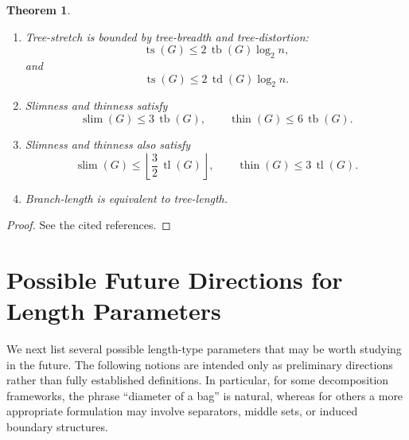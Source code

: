 \documentclass[10pt]{book}
\newtheorem{theorem}{Theorem}[section]
\theoremstyle{definition}
\DeclareMathOperator{\tl}{tl}
\DeclareMathOperator{\tb}{tb}
\begin{document}
\begin{theorem}
\begin{enumerate}
    \item Tree-stretch is bounded by tree-breadth and tree-distortion:
    \[
    \operatorname{ts}(G)\le 2\,\tb(G)\log_2 n,
    \]
    and
    \[
    \operatorname{ts}(G)\le 2\,\operatorname{td}(G)\log_2 n.
    \]
    \cite{dragan2014approximation}

    \item Slimness and thinness satisfy
    \[
    \operatorname{slim}(G)\le 3\,\tb(G),
    \qquad
    \operatorname{thin}(G)\le 6\,\tb(G).
    \]
    \cite{diestel2018connected,mohammed2019slimness}

    \item Slimness and thinness also satisfy
    \[
    \operatorname{slim}(G)\le \left\lfloor \frac{3}{2}\,\tl(G)\right\rfloor,
    \qquad
    \operatorname{thin}(G)\le 3\,\tl(G).
    \]
    \cite{mohammed2019slimness}

    \item Branch-length is equivalent to tree-length. \cite{umezawa2009tree}
\end{enumerate}
\end{theorem}

\begin{proof}
See the cited references.
\end{proof}

\section{Possible Future Directions for Length Parameters}
We next list several possible length-type parameters that may be worth studying in the future.  
The following notions are intended only as preliminary directions rather than fully established definitions.  
In particular, for some decomposition frameworks, the phrase ``diameter of a bag'' is natural, whereas for others a more appropriate formulation may involve separators, middle sets, or induced boundary structures.
\end{document}
